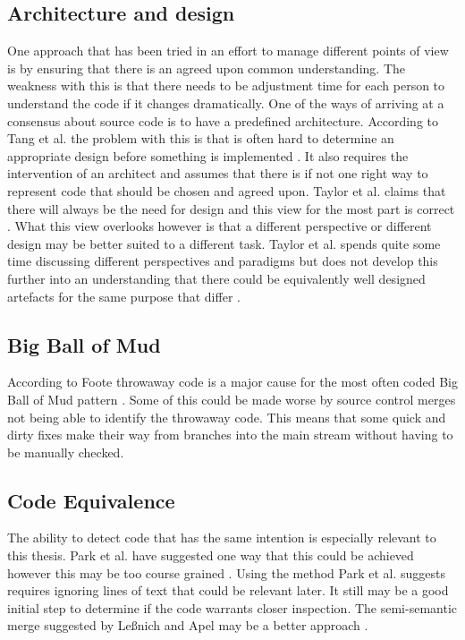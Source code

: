 \documentclass[12pt]{CRPITStyle}
\renewcommand{\cite}{\citep}
\begin{document}
\subsection{Architecture and design}
One approach that has been tried in an effort to manage different points of view is by ensuring that there is an agreed upon common understanding. The weakness with this is that there needs to be adjustment time for each person to understand the code if it changes dramatically. 
One of the ways of arriving at a consensus about source code is to have a predefined architecture. According to Tang et al. the problem with this is that is often hard to determine an appropriate design before something is implemented \cite{Tang2009}. It also requires the intervention of an architect and assumes that there is if not one right way to represent code that should be chosen and agreed upon. Taylor et al. claims that there will always be the need for design and this view for the most part is correct \cite{Taylor2007}. What this view overlooks however is that a different perspective or different design may be better suited to a different task. Taylor et al. spends quite some time discussing different perspectives and paradigms but does not develop this further into an understanding that there could be equivalently well designed artefacts for the same purpose that differ \cite{Taylor2007}.
\subsection{Big Ball of Mud}
According to Foote throwaway code is a major cause for the most often coded Big Ball of Mud pattern \cite{Foote1997}. Some of this could be made worse by source control merges not being able to identify the throwaway code. This means that some quick and dirty fixes make their way from branches into the main stream without having to be manually checked.
\subsection{Code Equivalence}
The ability to detect code that has the same intention is especially relevant to this thesis. Park et al. have suggested one way that this could be achieved however this may be too course grained \cite{Park2013}. Using the method Park et al. suggests requires ignoring lines of text that could be relevant later. It still may be a good initial step to determine if the code warrants closer inspection. The semi-semantic merge suggested by Le{\ss}nich and Apel may be a better approach \cite{LeBenich2012} \cite{Apel2011}.
\end{document}
